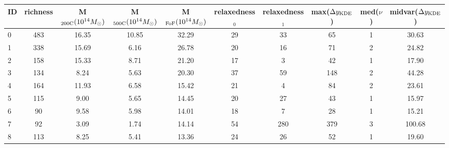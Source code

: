 \begin{tabular}{lccccccccc}
\toprule
ID & richness & M$_{\rm 200C} (10^{14} M_\odot)$ & M$_{\rm 500C} (10^{14} M_\odot)$ & M$_{\rm FoF} (10^{14} M_\odot)$  & relaxedness$_0$ & relaxedness$_1$ & max($\Delta y_{\rm KDE}$) & med($\nu$) & midvar($\Delta y_{\rm KDE}$) \\
\midrule
 0 &      483 &                            16.35 &                            10.85 &                            32.29 &              29 &              33 &                        65 &          1 &                        30.63 \\
 1 &      338 &                            15.69 &                             6.16 &                            26.78 &              20 &              16 &                        71 &          2 &                        24.82 \\
 2 &      158 &                            15.33 &                             8.71 &                            21.20 &              17 &               3 &                        42 &          1 &                        17.90 \\
 3 &      134 &                             8.24 &                             5.63 &                            20.30 &              37 &              59 &                       148 &          2 &                        44.28 \\
 4 &      164 &                            11.93 &                             6.58 &                            15.42 &              21 &               4 &                        84 &          2 &                        23.61 \\
 5 &      115 &                             9.00 &                             5.65 &                            14.45 &              20 &              27 &                        43 &          1 &                        15.97 \\
 6 &       90 &                             9.58 &                             5.98 &                            14.01 &              18 &               7 &                        28 &          1 &                        15.21 \\
 7 &       92 &                             3.09 &                             1.74 &                            14.14 &              54 &             280 &                       379 &          3 &                       100.68 \\
 8 &      113 &                             8.25 &                             5.41 &                            13.36 &              24 &              26 &                        52 &          1 &                        19.60 \\

\end{tabular}
